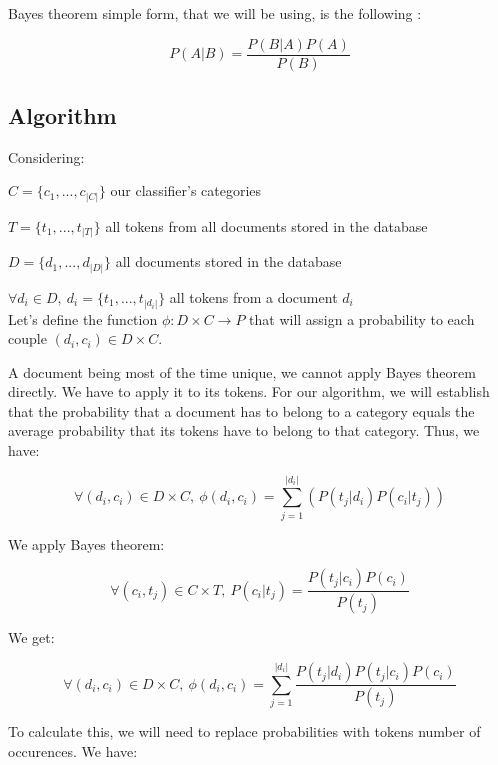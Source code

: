 \documentclass[a4paper,11pt]{article}
\begin{document}
Bayes theorem simple form, that we will be using, is the following :

\begin{equation}
    P(A| B) = \frac{P(B | A) P(A)}{P(B)}
\end{equation}


\subsection{Algorithm}

Considering:

$C = \{c_1, ..., c_{|C|}\}$ our classifier's categories

$T = \{t_1, ..., t_{|T|}\}$ all tokens from all documents stored in the database

$D = \{d_1, ..., d_{|D|}\}$ all documents stored in the database

$\forall d_i \in D,\ d_i = \{t_1, ..., t_{|d_i|}\}$ all tokens from a document $d_i$
~\\

Let's define the function $\phi : D \times C \rightarrow P$ that will assign
a probability to each couple
$(d_i, c_i) \in D \times C$.

A document being most of the time unique, we cannot apply Bayes theorem
directly. We have to apply it to its tokens. For our algorithm, we will
establish that the probability that a document has to belong to a category
equals the average probability that its tokens have to belong to that
category. Thus, we have:

\begin{equation}
    \forall (d_i, c_i) \in D \times C,\ 
    \phi(d_i, c_i)
    = \sum_{j=1}^{|d_i|} (P(t_j | d_i) P(c_i | t_j))
\end{equation}

We apply Bayes theorem:

\begin{equation}
    \forall (c_i, t_j) \in C \times T,\ 
    P(c_i| t_j)
    = \frac{P(t_j | c_i) P(c_i)}{P(t_j)}
\end{equation}

We get:

\begin{equation}\label{eq:final_prob}
    \forall (d_i, c_i) \in D \times C,\ 
    \phi(d_i, c_i)
    = \sum_{j=1}^{|d_i|} \frac{P(t_j | d_i) P(t_j | c_i) P(c_i)}{P(t_j)}
\end{equation}

To calculate this, we will need to replace probabilities with tokens number of
occurences. We have:
\end{document}
